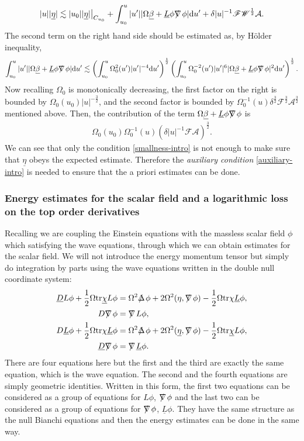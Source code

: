 \documentclass[11pt,reqno]{amsart}
\theoremstyle{definition}
\numberwithin{equation}{section}
\newcommand{\D}{\mathrm{d}}
\newcommand{\tr}{\mathrm{tr}}
\def\betab{\underline{\beta}}
\def\chib{\underline{\chi}}
\def\etab{\underline{\eta}}
\def\Lb{\underline{L}}
\def\tr{\mathrm{tr}}
\newcommand{\Db}{\underline{D}}
\def\nablas{\mbox{$\nabla \mkern -13mu /$ }}
\def\Deltas{\mbox{$\Delta \mkern -13mu /$ }}
\def\ds{\mbox{$\nabla \mkern -13mu /$ }}
\begin{document}
\begin{align*}
|u||\etab|\lesssim|u_0||\etab|\big|_{C_{u_0}}+\int_{u_0}^u|u'||\Omega\betab+\Lb\phi\nablas\phi|\D u'+\delta|u|^{-1}\mathscr{F}\mathscr{W}^{\frac{1}{2}}\mathcal{A}.
\end{align*}
The second term on the right hand side should be estimated as, by H\"older inequality,
\begin{align*}
\int_{u_0}^u|u'||\Omega\betab+\Lb\phi\nablas\phi|\D u'\lesssim\left(\int_{u_0}^u\Omega_0^2(u')|u'|^{-4}\D u'\right)^{\frac{1}{2}}\left(\int_{u_0}^u\Omega_0^{-2}(u')|u'|^6|\Omega\betab+\Lb\phi\nablas\phi|^2\D u'\right)^{\frac{1}{2}}.
\end{align*}
Now recalling $\Omega_0$ is monotonically decreasing, the first factor on the right is bounded by $\Omega_0(u_0)|u|^{-\frac{3}{2}}$, and the second factor is bounded by $\Omega_0^{-1}(u)\delta^{\frac{3}{2}}\mathcal{F}^{\frac{3}{2}}\mathcal{A}^{\frac{3}{2}}$ mentioned above. Then, the contribution of the term $\Omega\betab+\Lb\phi\nablas\phi$ is
\begin{align*}
\Omega_0(u_0)\Omega_0^{-1}(u)(\delta|u|^{-1}\mathscr{F}\mathcal{A})^{\frac{3}{2}}.
\end{align*}
We can see that only the condition \eqref{smallness-intro} is not enough to make sure that $\etab$ obeys the expected estimate. Therefore the \emph{auxiliary condition} \eqref{auxiliary-intro} is needed to ensure that the a priori estimates can be done.

\subsubsection{Energy estimates for the scalar field and a logarithmic loss on the top order derivatives}
Recalling we are coupling the Einstein equations with the massless scalar field $\phi$ which satisfying the wave equations, through which we can obtain estimates for the scalar field. We will not introduce the energy momentum tensor but simply do integration by parts using the wave equations written in the double null coordinate system:
\begin{align*}
\Db L\phi+\frac{1}{2}\Omega\tr\chib L\phi&=\Omega^2\Deltas\phi+2\Omega^2(\eta,\ds\phi)-\frac{1}{2}\Omega\tr\chi\Lb\phi,\\
D\ds\phi&=\nablas L\phi,\\
D\Lb\phi+\frac{1}{2}\Omega\tr\chi\Lb\phi&=\Omega^2\Deltas\phi+2\Omega^2(\etab,\ds\phi)-\frac{1}{2}\Omega\tr\chib L\phi,\\
\Db\ds\phi&=\nablas\Lb\phi.
\end{align*}
There are four equations here but the first and the third are exactly the same equation, which is the wave equation. The second and the fourth equations are simply geometric identities. Written in this form, the first two equations can be considered as a group of equations for $L\phi$, $\nablas\phi$ and the last two can be considered as a group of equations for $\nablas\phi$, $\Lb\phi$. They have the same structure as the null Bianchi equations and then the energy estimates can be done in the same way.
\end{document}
